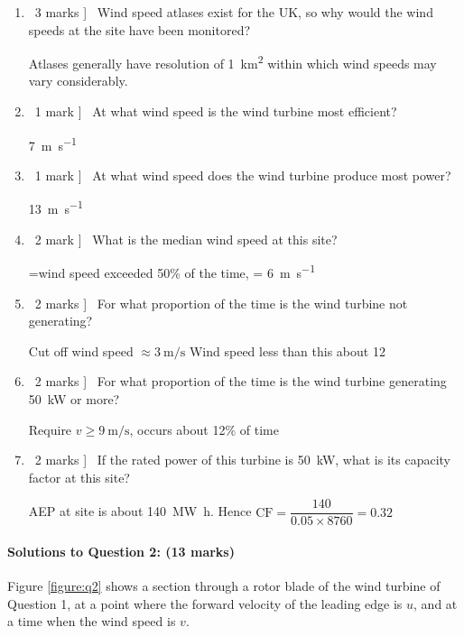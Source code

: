 \documentclass[a4paper,12pt,fleqn]{article}
\begin{document}
\begin{enumerate} [resume,label=\alph*)]
\item \lbrack\ 3 marks ] \ Wind speed atlases exist for the UK, so why would the wind speeds at the site have been monitored?\par
Atlases generally have resolution of \SI{1}{\km\squared} within which wind speeds may vary considerably.
\item \lbrack\ 1 mark ] \ At what wind speed is the wind turbine most efficient?\par
\SI{7}{\metre\per\second}
\item \lbrack\ 1 mark ] \ At what wind speed does the wind turbine produce most power?\par
\SI{13}{\metre\per\second}
\item \lbrack\ 2 mark ] \ What is the median wind speed at this site?\par
=wind speed exceeded 50\% of the time, = \SI{6}{\metre\per\second}
\item \lbrack\ 2 marks ] \ For what proportion of the time is the wind turbine not generating?\par
Cut off wind speed $\approx \SI{3}{\metre\per\second}$ Wind speed less than this about 12%
\item \lbrack\ 2 marks ] \ For what proportion of the time is the wind turbine generating \SI{50}{\kilo\watt} or more?\par
Require $v\geq\SI{9}{\metre\per\second}$, occurs about 12\% of time
\item \lbrack\ 2 marks ] \ If the rated power of this turbine is \SI{50}{\kilo\watt}, what is its capacity factor at this site?\par
AEP at site is about \SI{140}{\mega\watt\hour}. Hence $\mathrm{CF}=\dfrac{140}{0.05\times 8760}=0.32$
\end{enumerate}

\paragraph{\textbf{Solutions to Question 2: (13 marks)}}
Figure \ref{figure:q2} shows a section through a rotor blade of the wind turbine of Question 1, at a point where the forward velocity
 of the leading edge is $u$, and at a time when the wind speed is $v$.
\end{document}
